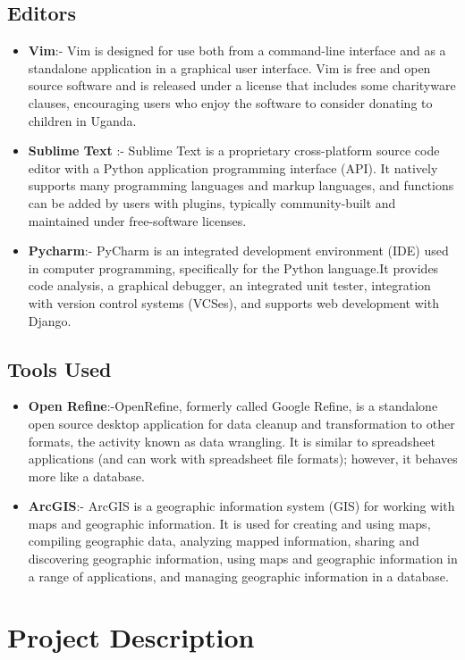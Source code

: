 \documentclass[12pt, oneside]{article}   	%
\begin{document}
\subsection{Editors}
\begin{itemize}
	\item \textbf{Vim}:- Vim is designed for use both from a command-line interface and as a standalone application in a graphical user interface. Vim is free and open source software and is released under a license that includes some charityware clauses, encouraging users who enjoy the software to consider donating to children in Uganda.
	\item \textbf{Sublime Text }:- Sublime Text is a proprietary cross-platform source code editor with a Python application programming interface (API). It natively supports many programming languages and markup languages, and functions can be added by users with plugins, typically community-built and maintained under free-software licenses.
	\item \textbf{Pycharm}:- PyCharm is an integrated development environment (IDE) used in computer programming, specifically for the Python language.It provides code analysis, a graphical debugger, an integrated unit tester, integration with version control systems (VCSes), and supports web development with Django.
\end{itemize}

\subsection{Tools Used}
\begin{itemize}
	\item \textbf{Open Refine}:-OpenRefine, formerly called Google Refine, is a standalone open source desktop application for data cleanup and transformation to other formats, the activity known as data wrangling. It is similar to spreadsheet applications (and can work with spreadsheet file formats); however, it behaves more like a database.
	\item \textbf{ArcGIS}:- ArcGIS is a geographic information system (GIS) for working with maps and geographic information. It is used for creating and using maps, compiling geographic data, analyzing mapped information, sharing and discovering geographic information, using maps and geographic information in a range of applications, and managing geographic information in a database.
\end{itemize}

\section{Project Description}
\end{document}
